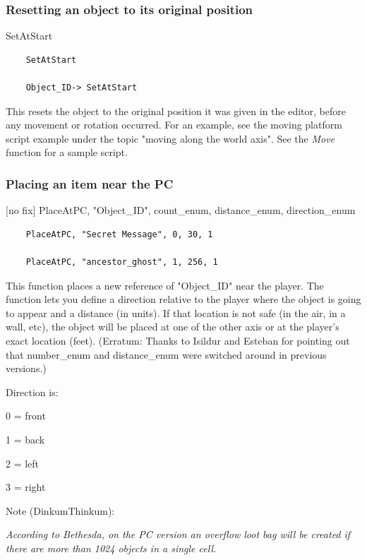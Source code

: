 \hypertarget{resetting-an-object-to-its-original-position}{%
\subsubsection{Resetting an object to its original
position}\label{resetting-an-object-to-its-original-position}}

SetAtStart

\begin{lstlisting}
	SetAtStart
	
	Object_ID-> SetAtStart
\end{lstlisting}

This resets the object to the original position it was given in the
editor, before any movement or rotation occurred. For an example, see
the moving platform script example under the topic "moving along the
world axis". See the \emph{Move} function for a sample script.

\hypertarget{placing-an-item-near-the-pc}{%
\subsubsection{Placing an item near the
PC}\label{placing-an-item-near-the-pc}}

{[}no fix{]} PlaceAtPC, "Object\_ID", count\_enum, distance\_enum,
direction\_enum

\begin{lstlisting}
	PlaceAtPC, "Secret Message", 0, 30, 1
	
	PlaceAtPC, "ancestor_ghost", 1, 256, 1
\end{lstlisting}

This function places a new reference of "Object\_ID" near the player.
The function lets you define a direction relative to the player where
the object is going to appear and a distance (in units). If that
location is not safe (in the air, in a wall, etc), the object will be
placed at one of the other axis or at the player's exact location
(feet). (Erratum: Thanks to Isildur and Esteban for pointing out that
number\_enum and distance\_enum were switched around in previous
versions.)

Direction is:

0 = front

1 = back

2 = left

3 = right

Note (DinkumThinkum):

\emph{According to Bethesda, on the PC version an overflow loot bag will
be created if there are more than 1024 objects in a single cell.}

